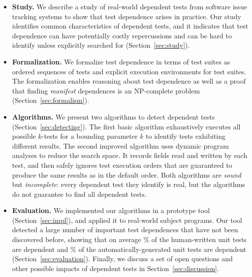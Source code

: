 \begin{itemize}

  \item \textbf{Study.} We describe a study of \dtnum real-world
  dependent tests from \repnum software issue tracking
  systems to show that test dependence
  arises in practice. Our study identifies common
  characteristics of dependent tests, and
  it indicates that test dependence can have
  potentially costly repercussions and can be hard to identify unless
  explicitly searched for (Section~\ref{sec:study}).

\item \textbf{Formalization.} We formalize test dependence
  in terms of test suites as ordered sequences of tests and explicit execution
  environments for test suites.  The formalization enables reasoning about test dependence
  as well as a proof that finding \emph{manifest} dependences is an NP-complete
  problem (Section~\ref{sec:formalism}).

  \item \textbf{Algorithms.} We present two algorithms
  to detect dependent tests (Section~\ref{sec:detecting}). The first
  basic algorithm exhaustively executes all possible $k$-tests for
  a bounding parameter $k$ to identify tests exhibiting different results.
  The second improved algorithm uses dynamic program analyses
  to reduce the search space. It records fields read and
  written by each test, and then safely ignores test execution orders
  that are guaranteed to produce the same results as in the default
  order. Both algorithms are \emph{sound} but \emph{incomplete}:
  every dependent test they identify is real, but the algorithms
  do not guarantee to find all dependent tests. 

  \item \textbf{Evaluation.} We implemented our algorithms in a prototype
  tool (Section~\ref{sec:impl}), and applied it to \subjnum real-world subject programs. Our
  tool detected a large number of important test dependences that have not
  been discovered before, showing that on average \% of the human-written
  unit tests are dependent and \% of the automatically-generated
  unit tests are dependent
   (Section~\ref{sec:evaluation}).
  Finally, we discuss a set of open questions and other possible impacts of dependent
  tests in Section~\ref{sec:discussion}.
\end{itemize}



